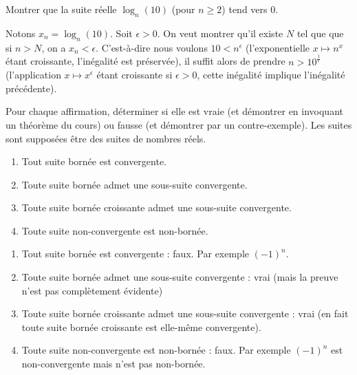 \documentclass[12pt,french,oneside,a4paper]{memoir} %
\begin{document}
\begin{exo}
Montrer que la suite réelle $\log_{n}(10)$ (pour $n \geq 2$) tend vers $0$.
\begin{correction}
  Notons $x_{n} = \log_n(10)$. Soit $\epsilon > 0$. On veut montrer qu'il existe $N$ tel que que si $n > N$, on a $x_{n} < \epsilon$. C'est-à-dire nous voulons $10 < n^{\epsilon}$ (l'exponentielle $x \mapsto n^{x}$ étant croissante, l'inégalité est préservée), il suffit alors de prendre $n > 10^{\frac 1 \epsilon}$ (l'application $x \mapsto x^{\epsilon}$ étant croissante si $\epsilon > 0$, cette inégalité implique l'inégalité précédente).
\end{correction}
\end{exo}
\begin{exo}
Pour chaque affirmation, déterminer si elle est vraie (et démontrer en invoquant un théorème du cours) ou fausse (et démontrer par un contre-exemple). Les suites sont supposées être des suites de nombres réels.
\begin{enumerate}
\item Tout suite bornée est convergente.
\item Toute suite bornée admet une sous-suite convergente.
\item Toute suite bornée croissante admet une sous-suite convergente.
\item Toute suite non-convergente est non-bornée.
\end{enumerate}
\begin{correction}
\begin{enumerate}
\item Tout suite bornée est convergente : faux. Par exemple $(-1)^{n}$.
\item Toute suite bornée admet une sous-suite convergente : vrai (mais la preuve n'est pas complètement évidente)
\item Toute suite bornée croissante admet une sous-suite convergente : vrai (en fait toute suite bornée croissante est elle-même convergente).
\item Toute suite non-convergente est non-bornée : faux. Par exemple $(-1)^{n}$ est non-convergente mais n'est pas non-bornée.
\end{enumerate}
\end{correction}
\end{exo}
\end{document}
